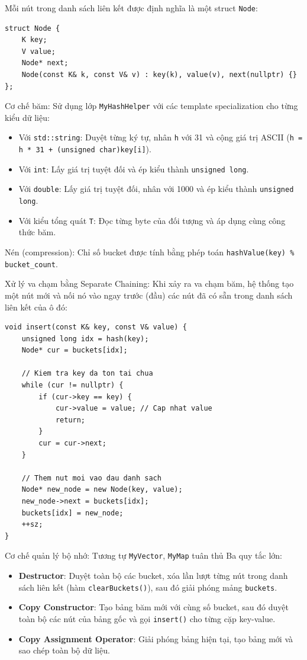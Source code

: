 \documentclass{report}
\begin{document}
Mỗi nút trong danh sách liên kết được định nghĩa là một struct \texttt{Node}:

\begin{lstlisting}[caption={Cấu trúc Node bên trong MyMap (File MyDataStructures.h)}, label={lst:node}]
struct Node {
    K key;
    V value;
    Node* next;
    Node(const K& k, const V& v) : key(k), value(v), next(nullptr) {}
};
\end{lstlisting}

Cơ chế băm: Sử dụng lớp \texttt{MyHashHelper} với các template specialization cho từng kiểu dữ liệu:
\begin{itemize}
    \item Với \texttt{std::string}: Duyệt từng ký tự, nhân \texttt{h} với 31 và cộng giá trị ASCII (\texttt{h = h * 31 + (unsigned char)key[i]}).
    \item Với \texttt{int}: Lấy giá trị tuyệt đối và ép kiểu thành \texttt{unsigned long}.
    \item Với \texttt{double}: Lấy giá trị tuyệt đối, nhân với 1000 và ép kiểu thành \texttt{unsigned long}.
    \item Với kiểu tổng quát \texttt{T}: Đọc từng byte của đối tượng và áp dụng cùng công thức băm.
\end{itemize}

Nén (compression): Chỉ số bucket được tính bằng phép toán \texttt{hashValue(key) \% bucket\_count}.

Xử lý va chạm bằng Separate Chaining: Khi xảy ra va chạm băm, hệ thống tạo một nút mới và nối nó vào ngay trước (đầu) các nút đã có sẵn trong danh sách liên kết của ô đó:

\begin{lstlisting}[caption={Thuật toán insert của MyMap (File MyDataStructures.h)}, label={lst:mapinsert}]
void insert(const K& key, const V& value) {
    unsigned long idx = hash(key);
    Node* cur = buckets[idx];

    // Kiem tra key da ton tai chua
    while (cur != nullptr) {
        if (cur->key == key) {
            cur->value = value; // Cap nhat value
            return;
        }
        cur = cur->next;
    }

    // Them nut moi vao dau danh sach
    Node* new_node = new Node(key, value);
    new_node->next = buckets[idx];
    buckets[idx] = new_node;
    ++sz;
}
\end{lstlisting}

Cơ chế quản lý bộ nhớ: Tương tự \texttt{MyVector}, \texttt{MyMap} tuân thủ Ba quy tắc lớn:
\begin{itemize}
    \item \textbf{Destructor}: Duyệt toàn bộ các bucket, xóa lần lượt từng nút trong danh sách liên kết (hàm \texttt{clearBuckets()}), sau đó giải phóng mảng \texttt{buckets}.
    \item \textbf{Copy Constructor}: Tạo bảng băm mới với cùng số bucket, sau đó duyệt toàn bộ các nút của bảng gốc và gọi \texttt{insert()} cho từng cặp key-value.
    \item \textbf{Copy Assignment Operator}: Giải phóng bảng hiện tại, tạo bảng mới và sao chép toàn bộ dữ liệu.
\end{itemize}
\end{document}
